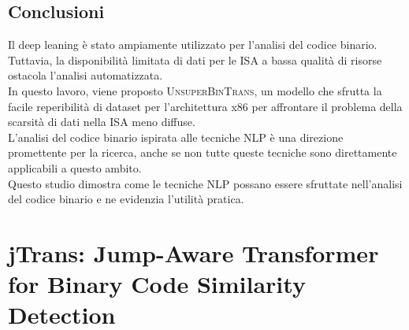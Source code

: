 \documentclass[12pt,a4paper,openright,twoside]{report}
\begin{document}
\subsection{Conclusioni}

Il deep leaning è stato ampiamente utilizzato per l'analisi del codice binario. Tuttavia, la disponibilità limitata di dati per le ISA a bassa qualità di risorse ostacola l'analisi automatizzata.\\
In questo lavoro, viene proposto \textsc{UnsuperBinTrans}, un modello che sfrutta la facile reperibilità di dataset per l'architettura x86 per affrontare il problema della scarsità di dati nella ISA meno diffuse.\\
L'analisi del codice binario ispirata alle tecniche NLP è una direzione promettente per la ricerca, anche se non tutte queste tecniche sono direttamente applicabili a questo ambito.\\
Questo studio dimostra come le tecniche NLP possano essere sfruttate nell'analisi del codice binario e ne evidenzia l'utilità pratica.\\


\section{jTrans: Jump-Aware Transformer for Binary Code Similarity Detection}
\end{document}
